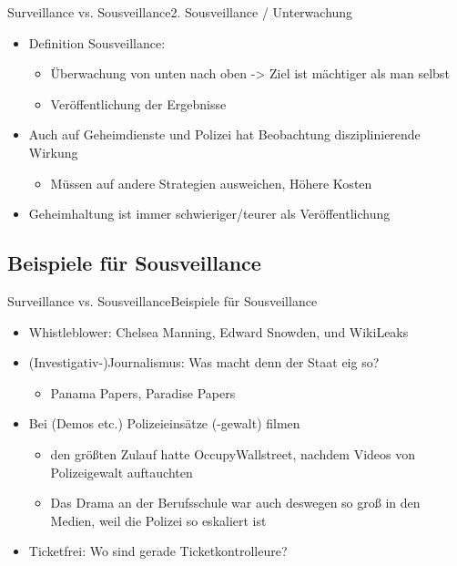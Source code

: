 \documentclass[10pt]{beamer}
\begin{document}
{\begin{frame}{Surveillance vs. Sousveillance}{2. Sousveillance / Unterwachung}
\begin{itemize}
  \item<1-> Definition Sousveillance:
  \begin{itemize}
    \item Überwachung von unten nach oben -> Ziel ist mächtiger als man selbst
    \item Veröffentlichung der Ergebnisse
  \end{itemize}
  \item<2-> Auch auf Geheimdienste und Polizei hat Beobachtung disziplinierende Wirkung
  \begin{itemize}
    \item<2-> Müssen auf andere Strategien ausweichen, Höhere Kosten
  \end{itemize}
  \item<2-> Geheimhaltung ist immer schwieriger/teurer als Veröffentlichung
\end{itemize}

\end{frame}

\subsection{Beispiele für Sousveillance}
\begin{frame}{Surveillance vs. Sousveillance}{Beispiele für Sousveillance}

\begin{itemize}
  \item<1-> Whistleblower: Chelsea Manning, Edward Snowden, und WikiLeaks
  \item<1-> (Investigativ-)Journalismus: Was macht denn der Staat eig so?
  \begin{itemize}
    \item<2-> Panama Papers, Paradise Papers
  \end{itemize}
  \item<2-> Bei (Demos etc.) Polizeieinsätze (-gewalt) filmen
  \begin{itemize}
    \item<2-> den größten Zulauf hatte OccupyWallstreet, nachdem Videos von Polizeigewalt auftauchten
    \item<2-> Das Drama an der Berufsschule war auch deswegen so groß in den Medien, weil die Polizei so eskaliert ist
  \end{itemize}
  \item<3-> Ticketfrei: Wo sind gerade Ticketkontrolleure?
\end{itemize}


\end{frame}}
\end{document}
